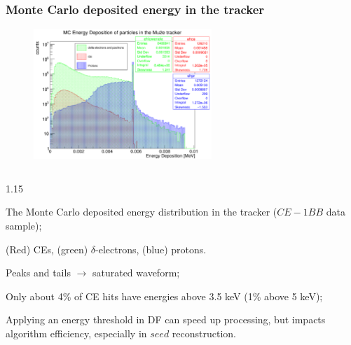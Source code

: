 \documentclass{beamer}
\begin{document}
\begin{frame}
    \frametitle{Monte Carlo deposited energy in the tracker}
    \vspace{-2mm}
\begin{figure}[!h]
    \centering
    \includegraphics[width =0.6\textwidth]{figures/png/Screenshot_20240729_151910.png}
   \end{figure}
       \vspace{-3mm}

   \begin{columns}
       \begin{column}{1.15\framewidth}
               \setlength{\leftmargini}{1.1em}
       \begin{itemize}
           
   {\small    \item The Monte Carlo deposited energy 
   distribution in the tracker ($CE-1BB$ data sample);
   \item (Red) CEs, (green) $\delta$-electrons, (blue) protons. 
   \item Peaks and tails $\rightarrow$ saturated waveform; 
   \item Only about 4\% of CE hits have energies above 3.5 keV 
(1\% above 5 keV);
   \item Applying an energy threshold in DF can speed up processing, but impacts algorithm efficiency, especially in $seed$ reconstruction.
        }

       \end{itemize}  
       \end{column}
   \end{columns}
\end{frame}
\end{document}
